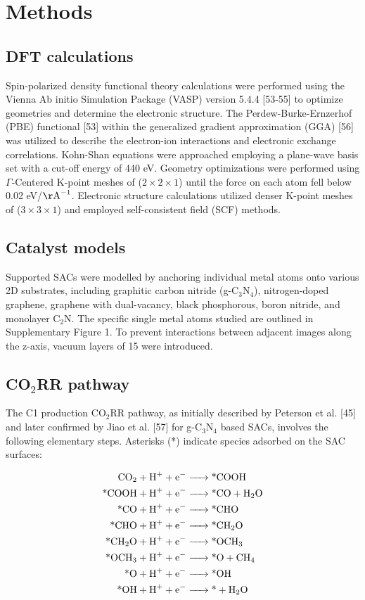 

\section{Methods}

\subsection{DFT calculations}
Spin-polarized density functional theory calculations were performed using the Vienna Ab initio Simulation Package (VASP) version 5.4.4 [53-55] to optimize geometries and determine the electronic structure.
The Perdew-Burke-Ernzerhof (PBE) functional [53] within the generalized gradient approximation (GGA) [56] was utilized to describe the electron-ion interactions and electronic exchange correlations.
Kohn-Shan equations were approached employing a plane-wave basis set with a cut-off energy of 440 eV.
Geometry optimizations were performed using $\Gamma$-Centered K-point meshes of ($2\times2\times1$) until the force on each atom fell below 0.02 eV/\(\mathrm{\AA}^{-1}\).
Electronic structure calculations utilized denser K-point meshes of ($3\times3\times1$) and employed self-consistent field (SCF) methods.


\subsection{Catalyst models}
Supported SACs were modelled by anchoring individual metal atoms onto various 2D substrates, including graphitic carbon nitride (g-C$_3$N$_4$), nitrogen-doped graphene, graphene with dual-vacancy, black phosphorous, boron nitride, and monolayer C$_2$N.
The specific single metal atoms studied are outlined in Supplementary Figure 1.
To prevent interactions between adjacent images along the z-axis, vacuum layers of 15 \text{\AA} were introduced.


\subsection{CO$_2$RR pathway}
The C1 production CO$_2$RR pathway, as initially described by Peterson et al. [45] and later confirmed by Jiao et al. [57] for g-C$_3$N$_4$ based SACs, involves the following elementary steps.
Asterisks (*) indicate species adsorbed on the SAC surfaces:

\begin{equation*}
\begin{aligned}
\ce{CO2 + H+ + e- &-> \text{*}COOH} \\
\ce{\text{*}COOH + H+ + e- &-> \text{*}CO + H2O} \\
\ce{\text{*}CO + H+ + e- &-> \text{*}CHO} \\
\ce{\text{*}CHO + H+ + e- &-> \text{*}CH2O} \\
\ce{\text{*}CH2O + H+ + e- &-> \text{*}OCH3} \\
\ce{\text{*}OCH3 + H+ + e- &-> \text{*}O + CH4} \\
\ce{\text{*}O + H+ + e- &-> \text{*}OH} \\
\ce{\text{*}OH + H+ + e- &-> \text{*} + H2O}
\end{aligned}
\end{equation*}


